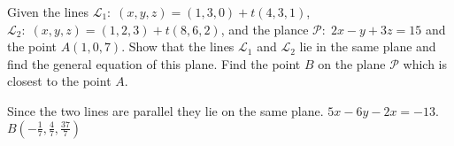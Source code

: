 
\begin{Exercise}[
name={},
title={}, 
difficulty=0,
origin={\cite{BS}}]
Given the lines $\mathcal{L}_1:\; (x, y, z) = (1, 3, 0) + t(4, 3, 1)$, $\mathcal{L}_2:\; (x, y, z) = (1, 2, 3) + t(8, 6, 2)$, and the plance $\mathcal{P}:\; 2x-y+3z=15$ and the point $A(1, 0, 7)$.
\Question Show that the lines $\mathcal{L}_1$ and $\mathcal{L}_2$ lie in the same plane and find the general equation of this plane.
\Question Find the point $B$ on the plane $\mathcal{P}$ which is closest to the point $A$.

\end{Exercise}
\begin{Answer}
\Question Since the two lines are parallel they lie on the same plane. $5x-6y-2x=-13$.
\Question $B(-\frac{1}{7}, \frac{4}{7}, \frac{37}{7})$
\end{Answer}
